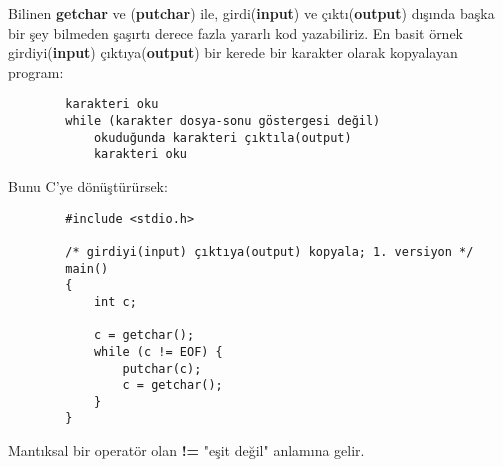 \documentclass[a4paper,12pt,oneside]{book}
\begin{document}
Bilinen \textbf{getchar} ve (\textbf{putchar}) ile, girdi(\textbf{input}) ve çıktı(\textbf{output}) dışında başka bir şey bilmeden şaşırtı derece fazla yararlı kod yazabiliriz. En basit örnek girdiyi(\textbf{input}) çıktıya(\textbf{output}) bir kerede bir karakter olarak kopyalayan program:
\begin{lstlisting}
		karakteri oku
		while (karakter dosya-sonu göstergesi değil)
			okuduğunda karakteri çıktıla(output)
			karakteri oku
\end{lstlisting}
Bunu C'ye dönüştürürsek:
\begin{lstlisting}
		#include <stdio.h>

		/* girdiyi(input) çıktıya(output) kopyala; 1. versiyon */
		main()
		{
			int c;

			c = getchar();
			while (c != EOF) {
				putchar(c);
				c = getchar();
			}
		}
\end{lstlisting}
Mantıksal bir operatör olan \textbf{ !=} "eşit değil" anlamına gelir.
\end{document}
